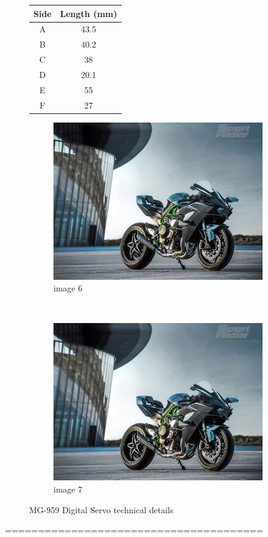 \documentclass{article}
\begin{document}
	\begin{figure}[H]
		\begin{minipage}[b]{0.2\textwidth}
			\centering \fontsize{10}{15}	 
			\begin{tabular}{cc}
				\hline 
				Side & Length (mm) \\ 
				\hline
				A & 43.5 \\ 
				B & 40.2 \\ 
				C & 38 \\  
				D & 20.1 \\
				E & 55 \\
				F & 27 \\
				\hline
			\end{tabular}
			\label{Table 1}	
		\end{minipage}\hspace{2cm}
		\begin{minipage}[b]{0.8\textwidth}
			\begin{subfigure}{0.8\linewidth}
				\centering
				\includegraphics[width=0.6\linewidth]{"images/h2.jpg"}
				\caption{image 6}
				\label{fig:7}
			\end{subfigure}
			\\
			\begin{subfigure}{0.8\linewidth}
				\centering
				\includegraphics[width=0.6\linewidth]{"images/h2.jpg"}
				\caption{image 7}
				\label{fig:8}
			\end{subfigure} 		 	 		
		\end{minipage}
		\caption{MG-959 Digital Servo technical details}
	\end{figure}
	=======================================	
	
\end{document}
